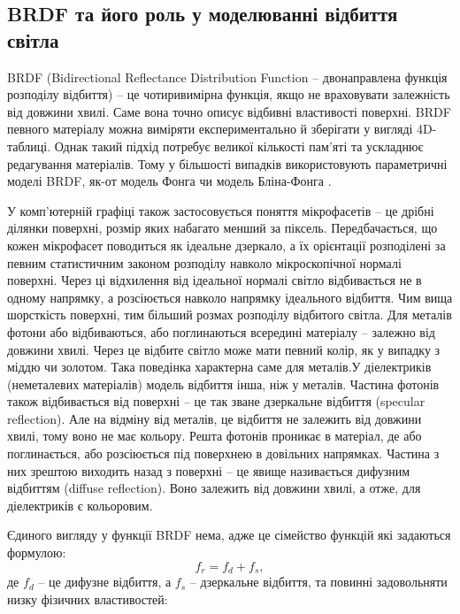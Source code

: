 \subsection{BRDF та його роль у моделюванні відбиття світла}
\phantom{Латех...}
\par BRDF (Bidirectional Reflectance Distribution Function -- двонаправлена функ\-ція розподілу відбиття) -- це чотиривимірна функція, якщо не враховувати залежність 
від довжини хвилі. Саме вона точно описує відбивні властивості поверхні. BRDF певного матеріалу можна виміряти експериментально й зберігати у вигляді 4D-таблиці. 
Однак такий підхід потребує великої кількості пам'яті та ускладнює редагування матеріалів. Тому у більшості випадків використовують параметричні моделі BRDF, як-от 
модель Фонга чи модель Бліна-Фонга \cite{Ch3}.
\par У комп'ютерній графіці також застосовується поняття мікрофасетів -- це дрібні ділянки поверхні, розмір яких набагато менший за піксель. 
Передбачається, що кожен мікрофасет поводиться як ідеальне дзеркало, а їх орієнтації розподілені за певним статистичним законом розподілу навколо мікро\-ско\-піч\-ної нормалі поверхні. Через ці відхилення від ідеальної нормалі світло відбивається не в одному напрямку, а розсіюється навколо напрямку ідеального відбиття.
Чим вища шорсткість поверхні, тим більший розмах розподілу відбитого світла. Для металів фотони або відбиваються, або поглинаються всередині матеріалу -- залежно від 
довжини хвилі. Через це відбите світло може мати певний колір, як у випадку з  міддю чи золотом. Така поведінка характерна саме для металів.У діелектриків 
(неметалевих матеріалів) модель відбиття інша, ніж у металів. Частина фотонів також відбивається від поверхні -- це так зване дзеркальне відбиття (specular reflection). 
Але на відміну від металів, це відбиття не залежить від довжини хвилі, тому воно не має кольору. Решта фотонів проникає в матеріал, де або поглинається, 
або розсіюється під поверхнею в довільних напрямках. Частина з них зрештою виходить назад з поверхні -- це явище називається дифузним відбиттям (diffuse reflection). Воно залежить від довжини хвилі, а отже, для діелектриків є кольоровим.
\par
Єдиного вигляду у функції BRDF нема, адже це сімейство функцій які задаються формулою:
\begin{equation}
\label{eq:BRDF_DS}
f_r = f_d + f_s,
\end{equation}
де $f_d$ -- це дифузне відбиття, а $f_s$ -- дзеркальне відбиття, та повинні задовольняти низку фізичних властивостей:

